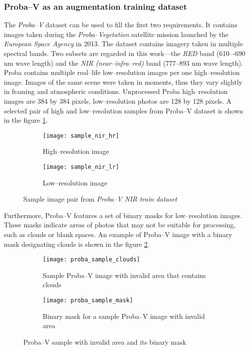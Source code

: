\subsubsection{Proba--V as an augmentation training dataset}
The \textit{Proba--V} dataset \cite{esa-proba} can be used to fill the first two requirements.
It contains images taken during the \textit{Proba--Vegetation} satellite mission launched by the \textit{European Space Agency} in 2013.
The dataset contains imagery taken in multiple spectral bands.
Two subsets are regarded in this work---the \textit{RED} band (610–-690 \si{\nano\meter} wave length) and the \textit{NIR (near--infra--red)} band (777--893 \si{\nano\meter} wave length).
Proba contains multiple real--life low--resolution images per one high--resolution image.
Images of the same scene were taken in moments, thus they vary slightly in framing and atmospheric conditions.
Unprocessed Proba high--resolution images are 384 by 384 pixels, low--resolution photos are 128 by 128 pixels.
A selected pair of high and low--resolution samples from Proba--V dataset is shown in the figure \ref{fig:proba-sample}.
\begin{figure}
    \begin{subfigure}{0.45\textwidth}
        \centering
        \texttt{[image: sample\_nir\_hr]}
        \caption{High--resolution image}
    \end{subfigure}
    \hfill
    \begin{subfigure}{0.45\textwidth}
        \centering
        \texttt{[image: sample\_nir\_lr]}
        \caption{Low--resolution image}
    \end{subfigure}
    \caption{Sample image pair from \textit{Proba--V NIR train dataset}}
    \label{fig:proba-sample}
\end{figure}
Furthermore, Proba--V features a set of binary masks for low--resolution images.
These masks indicate areas of photos that may not be suitable for processing, such as clouds or blank spaces.
An example of Proba--V image with a binary mask designating clouds is shown in the figure \ref{fig:proba_sample_mask}.
\begin{figure}
    \begin{subfigure}{0.45\textwidth}
        \centering
        \texttt{[image: proba\_sample\_clouds]}
        \caption{Sample Proba--V image with invalid area that contains clouds}
    \end{subfigure}
    \hfill
    \begin{subfigure}{0.45\textwidth}
        \centering
        \texttt{[image: proba\_sample\_mask]}
        \caption{Binary mask for a sample Proba--V image with invalid area}
    \end{subfigure}
    \caption{Proba--V sample with invalid area and its binary mask}
    \label{fig:proba_sample_mask}
\end{figure}


